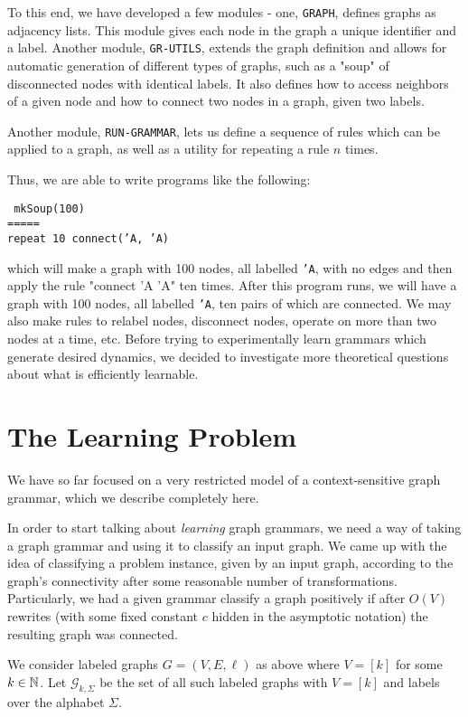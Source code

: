 \documentclass[]{article}
\def\Graphs{\mathcal{G}\xspace}
\begin{document}
To this end, we have developed a few modules - one, {\tt GRAPH}, defines graphs
as adjacency lists. This module gives each node in the
graph a unique identifier and a label. Another module, {\tt GR-UTILS}, extends
the graph definition and allows for automatic generation of different types of
graphs, such as a "soup" of disconnected nodes with identical labels. It also
defines how to access neighbors of a given node and how to connect two
nodes in a graph, given two labels.

Another module, {\tt RUN-GRAMMAR}, lets us define a sequence of rules which can
be applied to a graph, as well as a utility for repeating a rule $n$ times.

Thus, we are able to write programs like the following:

\texttt{
mkSoup(100) \\
===== \\
repeat 10 connect('A, 'A)
}

which will make a graph with 100 nodes, all labelled {\tt 'A}, with no edges and
then apply the rule "connect 'A 'A" ten times. After this program runs, we will
have a graph with 100 nodes, all labelled {\tt 'A}, ten pairs of which are
connected. We may also make rules to relabel nodes, disconnect nodes, operate on
more than two nodes at a time, etc. Before trying to experimentally learn 
grammars which generate desired dynamics, we decided to investigate more
theoretical questions about what is efficiently learnable.


\section{The Learning Problem}\label{the-learning-problem}

We have so far focused on a very restricted model of a context-sensitive graph
grammar, which we describe completely here.

In order to start talking about \emph{learning} graph grammars, we need a way of
taking a graph grammar and using it to classify an input graph. We came up with
the idea of classifying a problem instance, given by an input graph, according to the graph's connectivity after some reasonable number of transformations. Particularly, we had a given grammar classify a graph positively if after $O(V)$ rewrites (with some fixed constant $c$ hidden in the asymptotic notation) the resulting graph was connected.

We consider labeled graphs $G = (V,E,\ell)$ as above where $V = [k]$ for some
$k\in \N$. Let $\Graphs_{k,\Sigma}$ be the set of all such labeled graphs with
$V=[k]$ and labels over the alphabet $\Sigma$.
\end{document}
